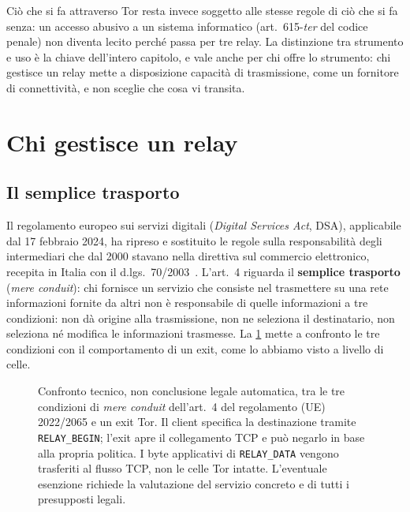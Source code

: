 Ciò che si fa attraverso Tor resta invece soggetto alle stesse regole di ciò che si fa senza: un accesso abusivo a un sistema informatico (art.~615-\emph{ter} del codice penale) non diventa lecito perché passa per tre relay. La distinzione tra strumento e uso è la chiave dell'intero capitolo, e vale anche per chi offre lo strumento: chi gestisce un relay mette a disposizione capacità di trasmissione, come un fornitore di connettività, e non sceglie che cosa vi transita.

\section{Chi gestisce un relay}\label{sec:legale-relay}

\subsection{Il semplice trasporto}

Il regolamento europeo sui servizi digitali (\emph{Digital Services Act}, DSA), applicabile dal 17 febbraio 2024, ha ripreso e sostituito le regole sulla responsabilità degli intermediari che dal 2000 stavano nella direttiva sul commercio elettronico, recepita in Italia con il d.lgs.\ 70/2003~\cite{dsa2022}. L'art.~4 riguarda il \textbf{semplice trasporto} (\emph{mere conduit}): chi fornisce un servizio che consiste nel trasmettere su una rete informazioni fornite da altri non è responsabile di quelle informazioni a tre condizioni: non dà origine alla trasmissione, non ne seleziona il destinatario, non seleziona né modifica le informazioni trasmesse. La \cref{fig:conduit} mette a confronto le tre condizioni con il comportamento di un exit, come lo abbiamo visto a livello di celle.

\begin{figure}[htbp]
\centering

\caption{Confronto tecnico, non conclusione legale automatica, tra le tre condizioni di \emph{mere conduit} dell'art.~4 del regolamento (UE) 2022/2065 e un exit Tor. Il client specifica la destinazione tramite \texttt{RELAY\_BEGIN}; l'exit apre il collegamento TCP e può negarlo in base alla propria politica. I byte applicativi di \texttt{RELAY\_DATA} vengono trasferiti al flusso TCP, non le celle Tor intatte. L'eventuale esenzione richiede la valutazione del servizio concreto e di tutti i presupposti legali.}
\label{fig:conduit}
\end{figure}

